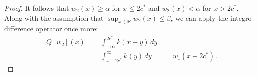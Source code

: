 \documentclass[11pt]{article}
\theoremstyle{definition}
\numberwithin{equation}{section}
\numberwithin{thm}{section}
\renewcommand{\a}{\alpha}
\renewcommand{\b}{\beta}
\begin{document}
\begin{proof}
It follows that $w_2(x)\geq\a$ for $x\leq 2c^*$ and $w_2(x)<\alpha$ for $x>2c^*$. Along with the assumption that $\sup_{x\in\mathbb R}w_2(x)\leq\b$, we can apply the integro-difference operator once more:
\begin{equation} \begin{aligned}
Q[w_2](x) %
&= \int_{-\infty}^{2c^*} k(x-y) \, dy \\
&= \int_{x-2c^*}^{\infty} k(y) \, dy &= w_1(x-2c^*).
\end{aligned} \end{equation}
\end{proof}
\end{document}

